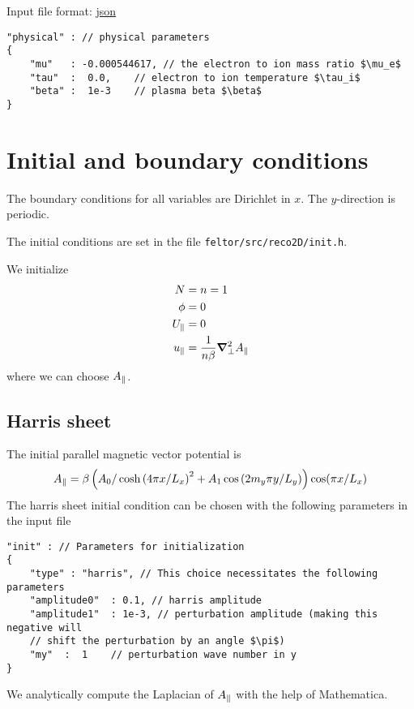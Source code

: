 Input file format: \href{https://en.wikipedia.org/wiki/JSON}{json} \\
\begin{verbatim}
"physical" : // physical parameters
{
    "mu"   : -0.000544617, // the electron to ion mass ratio $\mu_e$
    "tau"  :  0.0,    // electron to ion temperature $\tau_i$
    "beta" :  1e-3    // plasma beta $\beta$
}
\end{verbatim}

\section{Initial and boundary conditions}
The boundary conditions for all variables are Dirichlet in $x$.
The $y$-direction is periodic.

The initial conditions are set in the file \texttt{feltor/src/reco2D/init.h}.

We initialize
\begin{align}
 N&=n =1 \\
 \phi &= 0 \\
  U_\parallel&=0 \\
  u_\parallel &= \frac{1}{n  \beta }{\boldsymbol{\nabla}}^2_{\perp} A_\parallel
\end{align}
where we can choose $A_\parallel$.
\subsection{Harris sheet}
The initial parallel magnetic vector potential is
\begin{align}
    A_\parallel =\beta\left( A_0 / \cosh{( 4  \pi x / L_x )}^2 +A_1\cos{(2 m_y\pi y/L_y)}\right) \cos( \pi x /L_x)
\end{align}
The harris sheet initial condition can be chosen with the following parameters in the input file
\begin{verbatim}
"init" : // Parameters for initialization
{
    "type" : "harris", // This choice necessitates the following parameters
    "amplitude0"  : 0.1, // harris amplitude
    "amplitude1"  : 1e-3, // perturbation amplitude (making this negative will
    // shift the perturbation by an angle $\pi$)
    "my"  :  1    // perturbation wave number in y
}
\end{verbatim}
We analytically compute the Laplacian of $A_\parallel$ with the help of Mathematica.
